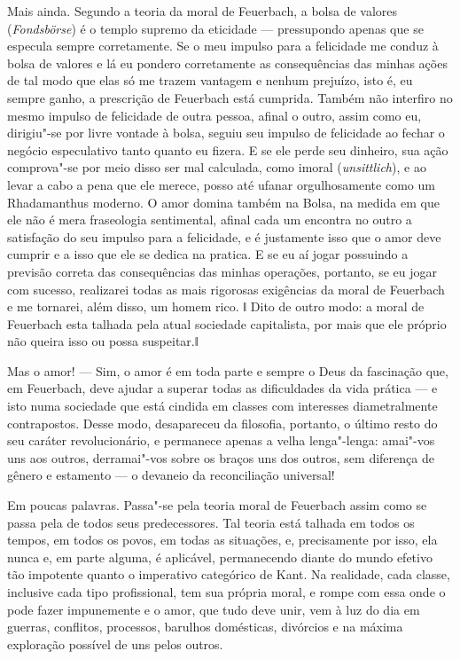 Mais ainda. Segundo a teoria da moral
de Feuerbach,
a bolsa de valores (\emph{Fondsbörse}) é o templo supremo da eticidade ---
pressupondo apenas que se especula sempre corretamente. Se o meu impulso
para a felicidade me conduz à bolsa de valores e lá eu pondero
corretamente as consequências das minhas ações de tal modo que elas só
me trazem vantagem e nenhum prejuízo, isto é, eu sempre ganho, a
prescrição
de Feuerbach está
cumprida. Também não interfiro no mesmo impulso de felicidade de outra
pessoa, afinal o outro, assim como eu, dirigiu"-se por livre vontade à
bolsa, seguiu seu impulso de felicidade ao fechar o negócio especulativo
tanto quanto eu fizera. E se ele perde seu dinheiro, sua ação
comprova"-se por meio disso ser mal calculada, como imoral
(\emph{unsittlich}), e ao levar a cabo a pena que ele merece, posso até
ufanar orgulhosamente como um Rhadamanthus moderno. O amor domina também
na Bolsa, na medida em que ele não é mera fraseologia sentimental,
afinal cada um encontra no outro a satisfação do seu impulso para a
felicidade, e é justamente isso que o amor deve cumprir e a isso que ele
se dedica na pratica. E se eu aí jogar possuindo a previsão correta das
consequências das minhas operações, portanto, se eu jogar com sucesso,
realizarei todas as mais rigorosas exigências da moral
de Feuerbach e
me tornarei, além disso, um homem rico. ǁ Dito de outro modo: a moral
de Feuerbach esta
talhada pela atual sociedade capitalista, por mais que ele próprio não
queira isso ou possa suspeitar.ǁ

Mas o amor! --- Sim, o amor é em toda parte e sempre o Deus da fascinação
que,
em Feuerbach,
deve ajudar a superar todas as dificuldades da vida prática --- e isto
numa sociedade que está cindida em classes com interesses diametralmente
contrapostos. Desse modo, desapareceu da filosofia, portanto, o último
resto do seu caráter revolucionário, e permanece apenas a velha
lenga"-lenga: amai"-vos uns aos outros, derramai"-vos sobre os braços uns
dos outros, sem diferença de gênero e estamento --- o devaneio da
reconciliação universal!

Em poucas palavras. Passa"-se pela teoria moral
de Feuerbach
assim como se passa pela de todos seus predecessores. Tal teoria está
talhada em todos os tempos, em todos os povos, em todas as situações, e,
precisamente por isso, ela nunca e, em parte alguma, é aplicável,
permanecendo diante do mundo efetivo tão impotente quanto o imperativo
categórico
de Kant.
Na realidade, cada classe, inclusive cada tipo profissional, tem sua
própria moral, e rompe com essa onde o pode fazer impunemente e o amor,
que tudo deve unir, vem à luz do dia em guerras, conflitos, processos,
barulhos domésticas, divórcios e na máxima exploração possível de uns
pelos outros.

